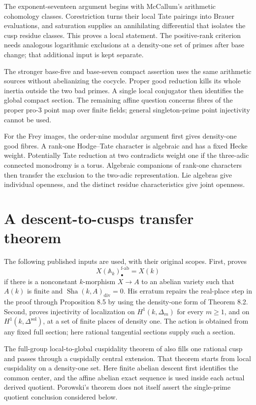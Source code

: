 \documentclass[11pt]{article}
\newcommand{\A}{\mathbb A}
\newcommand{\Sha}{\operatorname{Sha}}
\newcommand{\sol}{\mathrm{sol}}
\theoremstyle{definition}
\begin{document}
The exponent-seventeen argument begins with McCallum's arithmetic
cohomology classes. Corestriction turns their local Tate pairings into
Brauer evaluations, and saturation supplies an annihilating differential
that isolates the cusp residue classes. This proves a local statement.
The positive-rank criterion needs analogous logarithmic exclusions at a
density-one set of primes after base change; that additional input is
kept separate.

The stronger base-five and base-seven compact assertion uses the same
arithmetic sources without abelianizing the cocycle. Proper good reduction
kills its whole inertia outside the two bad primes. A single local
conjugator then identifies the global compact section. The remaining
affine question concerns fibres of the proper pro-$3$ point map over
finite fields; general singleton-prime point injectivity cannot be used.

For the Frey images, the order-nine modular argument first gives
density-one good fibres. A rank-one Hodge--Tate character is algebraic
and has a fixed Hecke weight. Potentially Tate reduction at two
contradicts weight one if the three-adic connected monodromy is a torus.
Algebraic companions of rank-one characters then transfer the exclusion
to the two-adic representation. Lie algebras give individual openness,
and the distinct residue characteristics give joint openness.

\section{A descent-to-cusps transfer theorem}

The following published inputs are used, with their original scopes.
First, \citet[Theorem 8.6]{Stoll2007} proves
\[
X(\A_k)_\bullet^{\mathrm{f\text{-}ab}}=X(k)
\tag{2.1}\label{eq:stoll}
\]
if there is a nonconstant $k$-morphism $X\to A$ to an abelian variety
such that $A(k)$ is finite and $\Sha(k,A)_{\mathrm{div}}=0$.
His erratum repairs the real-place step in the proof through
Proposition 8.5 by using the density-one form of Theorem 8.2.
Second, \citet[Proposition 3.1 and Theorem B]{Saidi2022} proves injectivity
of localization on $H^1(k,\Delta_m)$ for every $m\geq1$, and on
$H^1(k,\Delta^{\sol})$, at a set of finite places of density one.
The action is obtained from any fixed full section; here rational
tangential sections supply such a section.

The full-group local-to-global cuspidality theorem of
\citet[Theorem 2.2, pp.~3--4]{Porowski2025} also fills one rational
cusp and passes through a cuspidally central extension. That theorem
starts from local cuspidality on a density-one set. Here finite
abelian descent first identifies the common center, and the affine
abelian exact sequence is used inside each actual derived quotient.
Porowski's theorem does not itself assert the single-prime quotient
conclusion considered below.
\end{document}
